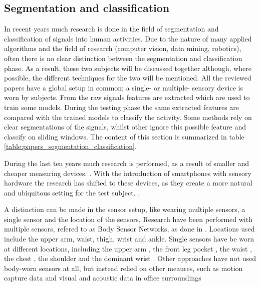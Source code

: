 
\subsection{Segmentation and classification}\label{sec:lit_review_segmentation}
In recent years much research is done in the field of segmentation and classification of signals into human activities.
Due to the nature of many applied algorithms and the field of research (computer vision, data mining, robotics), often there is no clear distinction between the segmentation and classification phase.
As a result, these two subjects will be discussed together although, where possible, the different techniques for the two will be mentioned.
All the reviewed papers have a global setup in common; a single- or multiple- sensory device is worn by subjects.
From the raw signals features are extracted which are used to train some models.
During the testing phase the same extracted features are compared with the trained models to classify the activity.
Some methods rely on clear segmentations of the signals, whilst other ignore this possible feature and classify on sliding windows.
The content of this section is summarized in table \ref{table:papers_segmentation_classification}.

During the last ten years much research is performed, as a result of smaller and cheaper measuring devices. .
With the introduction of smartphones with sensory hardware the research has shifted to these devices, as they create a more natural and ubiquitous setting for the test subject. .

A distinction can be made in the sensor setup, like wearing multiple sensors, a single sensor and the location of the sensors.
Research have been performed with multiple sensors, refered to as Body Sensor Networks, as done in \cite{guenterberg2009automatic, guenterberg2009distributed, bao2004activity, sherril2005using}.
Locations used include the upper arm, waist, thigh, wrist and ankle.
Single sensors have be worn at different locations, including the upper arm \cite{krause2003unsupervised}, the front leg pocket \cite{kwapisz2011activity, duque2012offline, siirtola2012recognizing, he2009activity}, the waist \cite{ravi2005activity, lester2006practical, lee2178physical}, the chest \cite{ahmed2012non, himberg2001time}, the shoulder \cite{lester2005hybrid} and the dominant wrist \cite{yang2008using, long2009single}.
Other approaches have not used body-worn sensors at all, but instead relied on other meaures, such as motion capture data \cite{barbivc2004segmenting, zhou2008aligned} and visual \cite{perdikis2008recognition} and acoustic data in office surroundings \cite{oliver2002layered}

